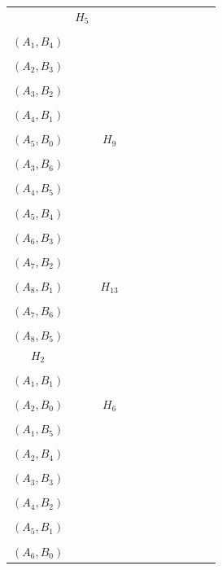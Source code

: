 \begin{enumerate}
\begin{longtable}[c]{|c|c|c|c|c|c|c|c|c|c|c|}
		&
		$H_5$ &
		\begin{tabular}[c]{@{}c@{}}$(A_0, B_5)$\\ \\ $(A_1, B_4)$\\ \\ $(A_2, B_3)$\\ \\ $(A_3, B_2)$\\ \\ $(A_4, B_1)$\\ \\ $(A_5, B_0)$\end{tabular} &
		&
		$H_9$ &
		\begin{tabular}[c]{@{}c@{}}$(A_2, B_7)$\\ \\ $(A_3, B_6)$\\ \\ $(A_4, B_5)$\\ \\ $(A_5, B_4)$\\ \\ $(A_6, B_3)$\\ \\ $(A_7, B_2)$\\ \\ $(A_8, B_1)$\end{tabular} &
		&
		$H_{13}$ &
		\begin{tabular}[c]{@{}c@{}}$(A_6, B_7)$\\ \\ $(A_7, B_6)$\\ \\ $(A_8, B_5)$\end{tabular} \\ \cline{1-2} \cline{4-5} \cline{7-8} \cline{10-11} 
		$H_2$ &
		\begin{tabular}[c]{@{}c@{}}$(A_0, B_2)$\\ \\ $(A_1, B_1)$\\ \\ $(A_2, B_0)$\end{tabular} &
		&
		$H_6$ &
		\begin{tabular}[c]{@{}c@{}}$(A_0, B_6)$\\ \\ $(A_1, B_5)$\\ \\ $(A_2, B_4)$\\ \\ $(A_3, B_3)$\\ \\ $(A_4, B_2)$\\ \\ $(A_5, B_1)$\\ \\ $(A_6, B_0)$\end{tabular} &

\end{longtable}
\end{enumerate}
